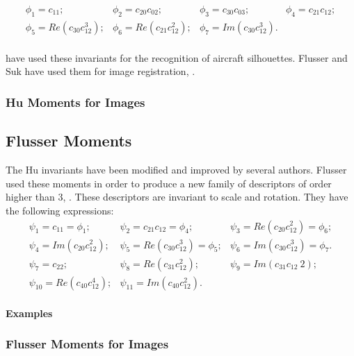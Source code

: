\begin{equation}
\begin{array}{cccc}
\phi_1 = c_{11};& \phi_2 = c_{20}c_{02};& \phi_3 = c_{30}c_{03};& \phi_4 = c_{21}c_{12};\\
\phi_5 = Re(c_{30}c_{12}^3);& \phi_6 = Re(c_{21}c_{12}^2);& \phi_7 = Im(c_{30}c_{12}^3).&\\
\end{array}
\end{equation}


\cite{dudani} have used these invariants for the recognition of
aircraft silhouettes. Flusser and Suk have used them for image
registration, \cite{flusser_2}.

\subsubsection{Hu Moments for Images}

%


\subsection{Flusser Moments}
\label{sec:FlusserMoments}
The Hu invariants have been modified and
improved by several authors. Flusser used these moments in order to
produce a new family of descriptors of order higher than 3,
\cite{flusserinv}. These descriptors are invariant to scale and
rotation. They have the following expressions:
\begin {equation}
\begin{array}{ccc}
\psi_1  = c_{11} = \phi_1; &  \psi_2  = c_{21}c_{12} = \phi_4; & \psi_3  = Re(c_{20}c_{12}^2) = \phi_6;\\
\psi_4  = Im(c_{20}c_{12}^2); & \psi_5  = Re(c_{30}c_{12}^3) = \phi_5;
& \psi_6  = Im(c_{30}c_{12}^3) = \phi_7.\\
\psi_7  = c_{22}; & \psi_8  = Re(c_{31}c_{12}^2); & \psi_9  = Im(c_{31}c_{12}~2);\\
\psi_{10} = Re(c_{40}c_{12}^4); & \psi_{11} = Im(c_{40}c_{12}^2). &\\

\end{array}
\end {equation}

\textbf{Examples}
\subsubsection{Flusser Moments for Images}

%

